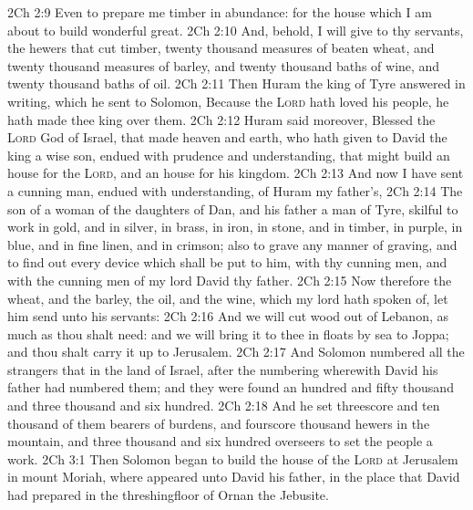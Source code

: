 \vs 2Ch 2:9 Even to prepare me timber in abundance: for the house which I am about to build  wonderful great.
\vs 2Ch 2:10 And, behold, I will give to thy servants, the hewers that cut timber, twenty thousand measures of beaten wheat, and twenty thousand measures of barley, and twenty thousand baths of wine, and twenty thousand baths of oil.
\vs 2Ch 2:11 Then Huram the king of Tyre answered in writing, which he sent to Solomon, Because the \textsc{Lord} hath loved his people, he hath made thee king over them.
\vs 2Ch 2:12 Huram said moreover, Blessed  the \textsc{Lord} God of Israel, that made heaven and earth, who hath given to David the king a wise son, endued with prudence and understanding, that might build an house for the \textsc{Lord}, and an house for his kingdom.
\vs 2Ch 2:13 And now I have sent a cunning man, endued with understanding, of Huram my father's,
\vs 2Ch 2:14 The son of a woman of the daughters of Dan, and his father  a man of Tyre, skilful to work in gold, and in silver, in brass, in iron, in stone, and in timber, in purple, in blue, and in fine linen, and in crimson; also to grave any manner of graving, and to find out every device which shall be put to him, with thy cunning men, and with the cunning men of my lord David thy father.
\vs 2Ch 2:15 Now therefore the wheat, and the barley, the oil, and the wine, which my lord hath spoken of, let him send unto his servants:
\vs 2Ch 2:16 And we will cut wood out of Lebanon, as much as thou shalt need: and we will bring it to thee in floats by sea to Joppa; and thou shalt carry it up to Jerusalem.
\vs 2Ch 2:17 And Solomon numbered all the strangers that  in the land of Israel, after the numbering wherewith David his father had numbered them; and they were found an hundred and fifty thousand and three thousand and six hundred.
\vs 2Ch 2:18 And he set threescore and ten thousand of them  bearers of burdens, and fourscore thousand  hewers in the mountain, and three thousand and six hundred overseers to set the people a work.
\vs 2Ch 3:1 Then Solomon began to build the house of the \textsc{Lord} at Jerusalem in mount Moriah, where  appeared unto David his father, in the place that David had prepared in the threshingfloor of Ornan the Jebusite.

